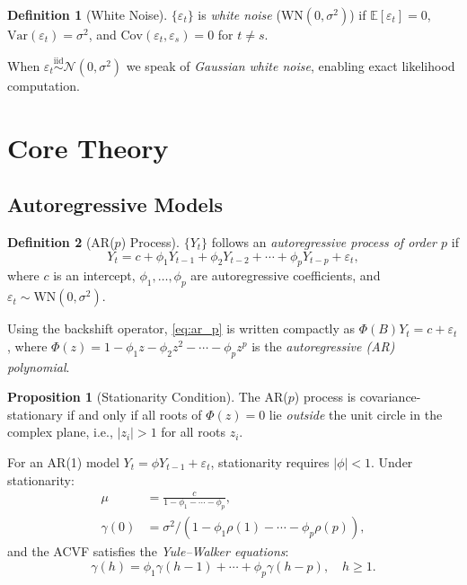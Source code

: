 \documentclass[conference]{IEEEtran}
\theoremstyle{definition}
\newtheorem{definition}{Definition}[section]
\newtheorem{proposition}{Proposition}[section]
\begin{document}
\begin{definition}[White Noise]
$\{\varepsilon_t\}$ is \emph{white noise} (WN$(0,\sigma^2)$) if
$\mathbb{E}[\varepsilon_t]=0$, $\mathrm{Var}(\varepsilon_t)=\sigma^2$, and
$\mathrm{Cov}(\varepsilon_t, \varepsilon_s)=0$ for $t \neq s$.
\end{definition}

When $\varepsilon_t \stackrel{\text{iid}}{\sim} \mathcal{N}(0,\sigma^2)$ we
speak of \emph{Gaussian white noise}, enabling exact likelihood computation.

\section{Core Theory}
\label{sec:theory}

\subsection{Autoregressive Models}

\begin{definition}[AR($p$) Process]
$\{Y_t\}$ follows an \emph{autoregressive process of order $p$} if
\begin{equation}
  Y_t = c + \phi_1 Y_{t-1} + \phi_2 Y_{t-2} + \cdots + \phi_p Y_{t-p}
        + \varepsilon_t,
  \label{eq:ar_p}
\end{equation}
where $c$ is an intercept, $\phi_1,\ldots,\phi_p$ are autoregressive
coefficients, and $\varepsilon_t \sim \mathrm{WN}(0,\sigma^2)$.
\end{definition}

Using the backshift operator, \eqref{eq:ar_p} is written compactly as
$\Phi(B)Y_t = c + \varepsilon_t$, where
$\Phi(z) = 1 - \phi_1 z - \phi_2 z^2 - \cdots - \phi_p z^p$
is the \emph{autoregressive (AR) polynomial}.

\begin{proposition}[Stationarity Condition]
The AR($p$) process is covariance-stationary if and only if all roots of
$\Phi(z) = 0$ lie \emph{outside} the unit circle in the complex plane,
i.e., $|z_i| > 1$ for all roots $z_i$.
\end{proposition}

For an AR(1) model $Y_t = \phi Y_{t-1} + \varepsilon_t$, stationarity requires
$|\phi| < 1$. Under stationarity:
\begin{align}
  \mu &= \frac{c}{1 - \phi_1 - \cdots - \phi_p}, \label{eq:ar_mean}\\
  \gamma(0) &= \sigma^2 / (1 - \phi_1 \rho(1) - \cdots - \phi_p \rho(p)),
  \label{eq:ar_var}
\end{align}
and the ACVF satisfies the \emph{Yule--Walker equations}:
\begin{equation}
  \gamma(h) = \phi_1\gamma(h-1) + \cdots + \phi_p\gamma(h-p), \quad h \geq 1.
  \label{eq:yw}
\end{equation}
\end{document}
